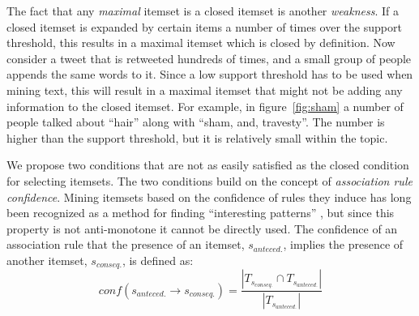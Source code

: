 \documentclass{sig-alternate}
\begin{document}
The fact that any \emph{maximal} itemset is a closed itemset
is another \emph{weakness}. %
If a closed itemset is expanded by certain items a number of times
over the support threshold, this results in a maximal itemset
which is closed by definition.
Now consider a tweet that is retweeted hundreds of times, 
and a small group of people appends the same words to it.
Since  a low support threshold has to be used when mining text,
this will result in a maximal itemset that
might not be adding any information to the closed itemset.
For example, in figure~\ref{fig:sham} a number of people
talked about ``hair'' along with ``sham, and, travesty''. 
The number is higher than the support threshold,
but it is relatively small within the topic.

We propose two conditions that are not as easily satisfied as the closed
condition for selecting itemsets.
The two conditions build on the concept of \emph{association rule confidence}.
Mining itemsets based on the confidence of rules they induce has long been
recognized as a method for finding
``interesting patterns'' \cite{cohen2001finding},
but since this property is not anti-monotone 
it cannot be directly used.
The confidence of an association rule that the presence of an itemset,
$s_{anteced.}$, implies the presence of another itemset, $s_{conseq.}$, is  defined as:
\begin{equation}\label{eq:conf}conf(s_{anteced.} \rightarrow s_{conseq.}) = \frac{|T_{s_{conseq.}} \cap T_{s_{anteced.}}|}{|T_{s_{anteced.}}|}\end{equation}
\end{document}
